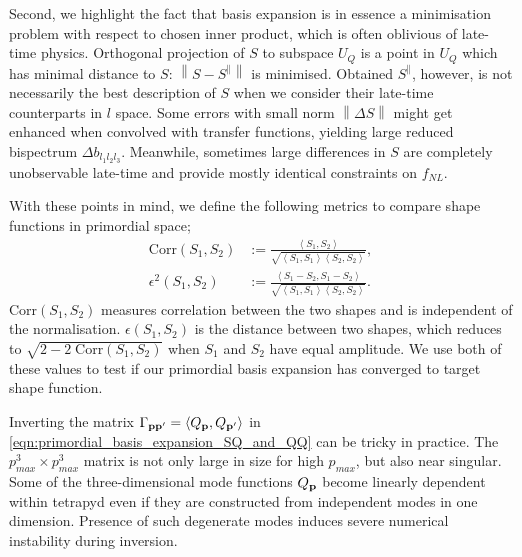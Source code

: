 Second, we highlight the fact that basis expansion is in essence a minimisation problem with respect to chosen inner product, which is often oblivious of late-time physics. Orthogonal projection of $S$ to subspace $U_Q$ is a point in $U_Q$ which has minimal distance to $S$: $\left\| S - S^\parallel \right\|$ is minimised. Obtained $S^\parallel$, however, is not necessarily the best description of $S$ when we consider their late-time counterparts in $l$ space. Some errors with small norm $\left\| \Delta S \right\|$ might get enhanced when convolved with transfer functions, yielding large reduced bispectrum $\Delta b_{l_1 l_2 l_3}$. Meanwhile, sometimes large differences in $S$ are completely unobservable late-time and provide mostly identical constraints on $f_{NL}$.

With these points in mind, we define the following metrics to compare shape functions in primordial space;
\begin{align}
	\text{Corr}(S_1, S_2) &:= \frac{\left< S_1, S_2 \right>}{ \sqrt{ \left< S_1, S_1 \right> \left< S_2, S_2 \right> } }, \\
	\epsilon^2(S_1, S_2) &:= \frac{\left< S_1 - S_2, S_1 - S_2 \right> }{\sqrt{\left< S_1, S_1 \right> \left< S_2, S_2 \right>}}. \label{def:primordial_shape_epsilon}
\end{align}
Corr$(S_1,S_2)$ measures correlation between the two shapes and is independent of the normalisation. $\epsilon(S_1,S_2)$ is the distance between two shapes, which reduces to $\sqrt{2 - 2\;\text{Corr}(S_1,S_2)}$ when $S_1$ and $S_2$ have equal amplitude. We use both of these values to test if our primordial basis expansion has converged to target shape function. 

Inverting the matrix $\Gamma_{\mathbf{p} \mathbf{p}'} = \left< Q_\mathbf{p}, Q_{\mathbf{p}'} \right>$ in \eqref{eqn:primordial_basis_expansion_SQ_and_QQ} can be tricky in practice. The $p_{max}^3 \times p_{max}^3$ matrix is not only large in size for high $p_{max}$, but also near singular. Some of the three-dimensional mode functions $Q_\mathbf{p}$ become linearly dependent within tetrapyd even if they are constructed from independent modes in one dimension. Presence of such degenerate modes induces severe numerical instability during inversion.

